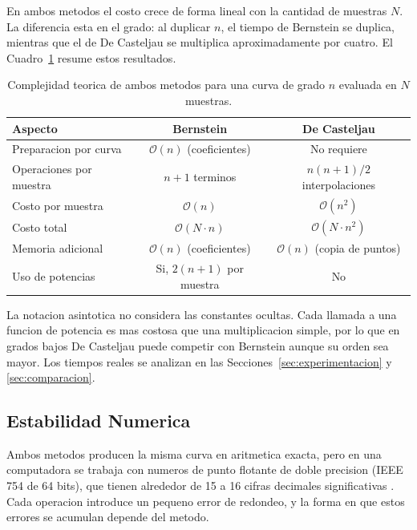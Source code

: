 En ambos metodos el costo crece de forma lineal con la cantidad de muestras $N$. La diferencia esta en el grado: al duplicar $n$, el tiempo de Bernstein se duplica, mientras que el de De Casteljau se multiplica aproximadamente por cuatro. El Cuadro~\ref{tab:fund_complejidad} resume estos resultados.

\begin{table}[H]
\centering
\caption{Complejidad teorica de ambos metodos para una curva de grado $n$ evaluada en $N$ muestras.}
\label{tab:fund_complejidad}
\begin{tabular}{lcc}
\toprule
\textbf{Aspecto} & \textbf{Bernstein} & \textbf{De Casteljau} \\
\midrule
Preparacion por curva & $\mathcal{O}(n)$ (coeficientes) & No requiere \\
Operaciones por muestra & $n + 1$ terminos & $n(n+1)/2$ interpolaciones \\
Costo por muestra & $\mathcal{O}(n)$ & $\mathcal{O}(n^2)$ \\
Costo total & $\mathcal{O}(N \cdot n)$ & $\mathcal{O}(N \cdot n^2)$ \\
Memoria adicional & $\mathcal{O}(n)$ (coeficientes) & $\mathcal{O}(n)$ (copia de puntos) \\
Uso de potencias & Si, $2(n+1)$ por muestra & No \\
\bottomrule
\end{tabular}
\end{table}

La notacion asintotica no considera las constantes ocultas. Cada llamada a una funcion de potencia es mas costosa que una multiplicacion simple, por lo que en grados bajos De Casteljau puede competir con Bernstein aunque su orden sea mayor. Los tiempos reales se analizan en las Secciones~\ref{sec:experimentacion} y \ref{sec:comparacion}.

\subsection{Estabilidad Numerica}
\label{subsec:fund_estabilidad}

Ambos metodos producen la misma curva en aritmetica exacta, pero en una computadora se trabaja con numeros de punto flotante de doble precision (IEEE 754 de 64 bits), que tienen alrededor de 15 a 16 cifras decimales significativas \cite{ieee754}. Cada operacion introduce un pequeno error de redondeo, y la forma en que estos errores se acumulan depende del metodo.

